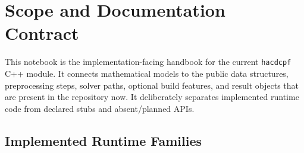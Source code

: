 \section{Scope and Documentation Contract}
\label{sec:scope}

This notebook is the implementation-facing handbook for the current
\texttt{hacdcpf} C++ module.  It connects mathematical models to the public
data structures, preprocessing steps, solver paths, optional build features,
and result objects that are present in the repository now.  It deliberately
separates implemented runtime code from declared stubs and absent/planned APIs.

\subsection{Implemented Runtime Families}

